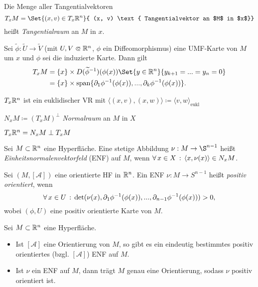 \documentclass{cheat-sheet}
\newcommand{\Atlas}{\mathcal{A}} %
\theoremstyle{definition}
\newcommand{\scp}[2]{\langle #1 , #2 \rangle} %
\begin{document}
\begin{defn}
  Die Menge aller Tangentialvektoren
  \[ T_x M = \Set{ (x, v) \in T_x \R^n }{ (x, v) \text{ Tangentialvektor an $M$ in $x$}} \]
  heißt \emph{Tangentialraum} an $M$ in $x$.
\end{defn}

\begin{prop}
  Sei $\widetilde{\phi} : \widetilde{U} \to \widetilde{V}$ (mit $U, V \opn \R^n$, $\phi$ ein Diffeomorphismus) eine UMF-Karte von $M$ um $x$ und $\phi$ sei die induzierte Karte. Dann gilt
  \begin{align*}
    T_x M &= \{ x \} \times D (\widetilde{\phi}^{-1}) (\phi(x)) \Set{ y \in \R^n }{ y_{k+1} = ... = y_n = 0 } \\
    &= \{ x \} \times \mathrm{span} \{ \partial_1 \phi^{-1} (\phi(x)), ..., \partial_k \phi^{-1} (\phi(x)) \}.
  \end{align*}
\end{prop}

$T_x \mathbb{R}^n$ ist ein euklidischer VR mit $\langle (x, v), (x, w) \rangle \coloneqq \langle v, w \rangle_{\mathrm{eukl}}$

$N_x M \coloneqq (T_x M)^\perp$ \emph{Normalraum} an $M$ in $X$

$T_x \mathbb{R}^n = N_x M \perp T_x M$


\begin{defn}
  Sei $M \subset \mathbb{R}^n$ eine Hyperfläche. Eine stetige Abbildung $\nu : M \to \S^{n {-} 1}$ heißt \emph{Einheitsnormalenvektorfeld} (ENF) auf $M$, wenn $\fa{x \in X} \scp{x}{\nu(x)} \in N_x M$.
\end{defn}

\begin{defn}
  Sei $(M, [\Atlas])$ eine orientierte HF in $\mathbb{R}^n$. Ein ENF $\nu : M \to S^{n {-} 1}$ heißt \emph{positiv orientiert}, wenn
  \[ \forall \, {x \in U} \,:\, \det(\nu(x), \partial_1 \phi^{-1}(\phi(x)), ..., \partial_{n {-} 1} \phi^{-1} (\phi(x))) > 0, \]
  wobei $(\phi, U)$ eine positiv orientierte Karte von $M$.
\end{defn}

\begin{satz}
  Sei $M \subset \mathbb{R}^n$ eine Hyperfläche.
  \begin{itemize}
    \item Ist $[\Atlas]$ eine Orientierung von $M$, so gibt es ein eindeutig bestimmtes positiv orientiertes (bzgl. $[\Atlas]$) ENF auf $M$.
    \item Ist $\nu$ ein ENF auf $M$, dann trägt $M$ genau eine Orientierung, sodass $\nu$ positiv orientiert ist.
  \end{itemize}
\end{satz}
\end{document}
